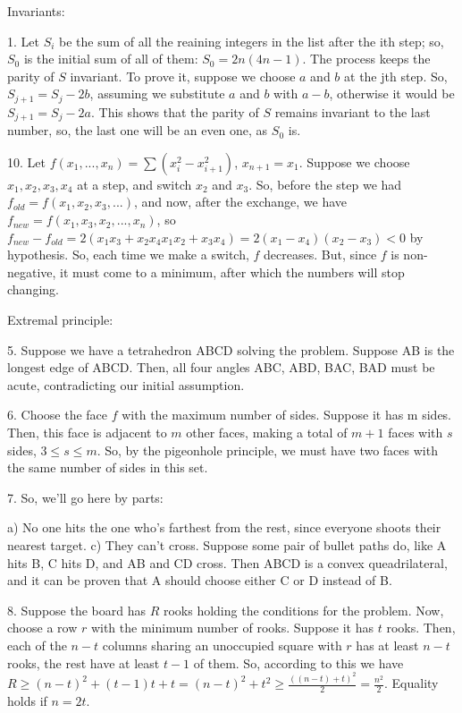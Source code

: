 \documentclass[12pt]{minimal}
\begin{document}
Invariants:

1.  Let $S_i$ be the sum of all the reaining integers in the list after the ith
    step; so, $S_0$ is the initial sum of all of them: $S_0 = 2n(4n - 1)$. The
    process keeps the parity of $S$ invariant. To prove it, suppose we choose
    $a$ and $b$ at the jth step. So, $S_{j + 1} = S_j - 2b$, assuming we
    substitute $a$ and $b$ with $a - b$, otherwise it would be $S_{j + 1} = S_j
    - 2a$. This shows that the parity of $S$ remains invariant to the last
    number, so, the last one will be an even one, as $S_0$ is.

10. Let $f(x_1, ..., x_n) = \sum{(x_i^2 - x_{i + 1}^2)}$, $x_{n + 1} = x_1$. Suppose
    we choose $x_1, x_2, x_3, x_4$ at a step, and switch $x_2$ and $x_3$. So,
    before the step we had $f_{old} = f(x_1, x_2, x_3, ...)$, and now, after the
    exchange, we have $f_{new} = f(x_1, x_3, x_2, ..., x_n)$, so $f_{new} -
    f_{old} = 2(x_1 x_3 + x_2 x_4 x_1 x_2 + x_3 x_4) = 2(x_1 - x_4)(x_2 - x_3)
    < 0$ by hypothesis. So, each time we make a switch, $f$ decreases. But,
    since $f$ is non-negative, it must come to a minimum, after which the
    numbers will stop changing.

Extremal principle:

5.  Suppose we have a tetrahedron ABCD solving the problem. Suppose AB is the
    longest edge of ABCD. Then, all four angles ABC, ABD, BAC, BAD must be acute,
    contradicting our initial assumption.

6.  Choose the face $f$ with the maximum number of sides. Suppose it has m sides.
    Then, this face is adjacent to $m$ other faces, making a total of $m+1$
    faces with $s$ sides, $3 \leq s \leq m$. So, by the pigeonhole principle, we
    must have two faces with the same number of sides in this set.

7.  So, we'll go here by parts:

    a)  No one hits the one who's farthest from the rest, since everyone shoots
        their nearest target.
    c)  They can't cross. Suppose some pair of bullet paths do, like A hits B,
        C hits D, and AB and CD cross. Then ABCD is a convex queadrilateral, and
        it can be proven that A should choose either C or D instead of B.

8.  Suppose the board has $R$ rooks holding the conditions for the problem. Now, 
    choose a row $r$ with the minimum number of rooks. Suppose it has $t$ rooks.
    Then, each of the $n - t$ columns sharing an unoccupied square with $r$ has
    at least $n - t$ rooks, the rest have at least $t - 1$ of them. So,
    according to this we have $R \geq (n - t)^2 + (t - 1)t + t =(n - t)^2 + t^2
    \geq \frac{((n - t) + t)^2}{2} = \frac{n^2}{2}$. Equality holds if $n = 2t$.
\end{document}
